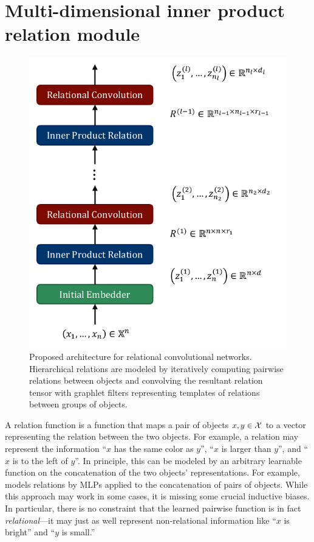 \section{Multi-dimensional inner product relation module}\label{sec:mhr}

\begin{figure}
    \centering
    \includegraphics[width=.5\textwidth]{figs/relconv_architecture.pdf}
    \caption{Proposed architecture for relational convolutional networks. Hierarchical relations are modeled by iteratively computing pairwise relations between objects and convolving the resultant relation tensor with graphlet filters representing templates of relations between groups of objects.
    }\label{fig:relconv_architecture}
\end{figure}

A relation function is a function that maps a pair of objects $x, y \in {\mathcal{X}}$ to a vector representing the relation between the two objects. For example, a relation may represent the information ``$x$ has the same color as $y$'', ``$x$ is larger than $y$'', and ``$x$ is to the left of $y$''. In principle, this can be modeled by an arbitrary learnable function on the concatenation of the two objects' representations. For example,~\citep{santoroSimpleNeural2017} models relations by MLPs applied to the concatenation of pairs of objects. While this approach may work in some cases, it is missing some crucial inductive biases. In particular, there is no constraint that the learned pairwise function is in fact \textit{relational}---it may just as well represent non-relational information like ``$x$ is bright'' and ``$y$ is small.''%

